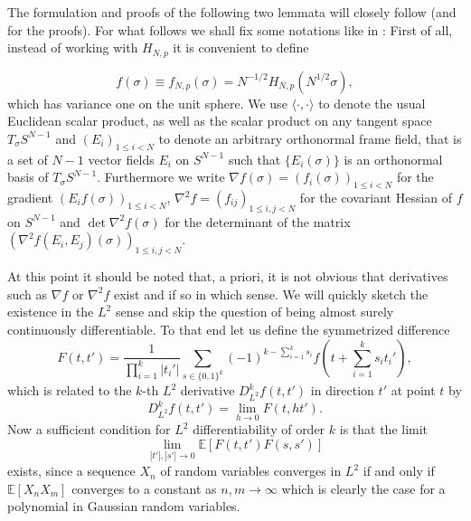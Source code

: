 The formulation and proofs of the following two lemmata will closely follow \cite{Cerny10} (and \cite{Adler07} for the proofs). For what follows we shall fix some notations like in \cite{Cerny10}:
First of all, instead of working with $H_{N,p}$ it is convenient to define

\begin{equation}\label{def:rescaledHamiltonian}
	f(\sigma)\equiv f_{N,p}(\sigma)=N^{-1/2}H_{N,p}(N^{1/2}\sigma),
\end{equation}
which has variance one on the unit sphere. We use $\langle\cdot,\cdot\rangle$ to denote the usual Euclidean scalar product, as well as the scalar product on any tangent space $T_\sigma S^{N-1}$ and $(E_i)_{1\leq i<N}$ to denote an arbitrary orthonormal frame field, that is a set of $N-1$ vector fields $E_i$ on $S^{N-1}$ such that $\{E_i(\sigma)\}$ is an orthonormal basis of $T_\sigma S^{N-1}$. Furthermore we write $\nabla f(\sigma)=(f_i(\sigma))_{1\leq i<N}$ for the gradient $(E_i f(\sigma))_{1\leq i<N}$, $\nabla^2 f = (f_{ij})_{1\leq i,j<N}$ for the covariant Hessian of $f$ on $S^{N-1}$ and $\det\nabla^2 f(\sigma)$ for the determinant of the matrix \newline$(\nabla^2 f(E_i,E_j)(\sigma))_{1\leq i,j<N}$.

At this point it should be noted that, a priori, it is not obvious that derivatives such as $\nabla f$ or $\nabla^2 f$ exist and if so in which sense. We will quickly sketch the existence in the $L^2$ sense and skip the question of being almost surely continuously differentiable. To that end let us define the symmetrized difference
$$F(t,t') = \frac{1}{\prod_{i=1}^k |t_i'|}\sum_{s\in\{0,1\}^k}(-1)^{k-\sum_{i=1}^k s_i}f\left(t+\sum_{i=1}^k s_i t_i'\right),$$
which is related to the $k$-th $L^2$ derivative $D_{L^2}^k f(t,t')$ in direction $t'$ at point $t$ by
$$D_{L^2}^k f(t,t') = \lim_{h\rightarrow 0} F(t,ht').$$
Now a sufficient condition for $L^2$ differentiability of order $k$ is that the limit $$\lim_{|t'|,|s'|\rightarrow 0}\mathbb E[F(t,t')F(s,s')]$$
exists, since a sequence $X_n$ of random variables converges in $L^2$ if and only if $\mathbb E[X_nX_m]$ converges to a constant as $n,m\rightarrow\infty$ which is clearly the case for a polynomial in Gaussian random variables.

